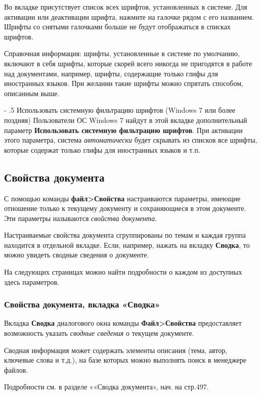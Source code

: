 ﻿\documentclass[a4paper,10pt]{article}
\makeatletter
\renewcommand\paragraph{%
   \@startsection{paragraph}{4}{0mm}%
      {-\baselineskip}%
      {.5\baselineskip}%
      {\normalfont\normalsize\bfseries}}
\makeatother
\begin{document}
 Во вкладке присутствует список всех шрифтов, установленных в системе. Для активации или деактивации шрифта, нажмите на галочке рядом с его названием. Шрифты со снятыми галочками больше не будут отображаться в списках шрифтов.
 
 Справочная информация: шрифты, установленные в системе по умолчанию, включают в себя шрифты, которые скорей всего никогда не пригодятся в работе над документами, например, шрифты, содержащие только глифы для иностранных языков. При желании такие шрифты можно спрятать способом, описанным выше.
 
 \paragraph{Использовать системную фильтрацию шрифтов (Windows 7 или более поздняя)}
 Пользователи ОС Windows 7 найдут в этой вкладке дополнительный параметр \textbf{Использовать системную фильтрацию шрифтов}. При активации этого параметра, система \textit{автоматически} будет скрывать из списков все шрифты, которые содержат только глифы для иностранных языков и т.п.
 
 \subsection{Свойства документа}
 С помощью команды \textbf{файл>Свойства} настраиваются параметры, имеющие отношение только к текущему документу и сохраняющиеся в этом документе. Эти параметры называются \textit{свойства документа}.
 
 Настраиваемые свойства документа сгруппированы по темам и каждая группа находится в отдельной вкладке. Если, например, нажать на вкладку \textbf{Сводка}, то можно увидеть сводные сведения о документе.
 
 На следующих страницах можно найти подробности о каждом из доступных здесь параметров.
 
 \subsubsection{Свойства документа, вкладка «Сводка»}
Вкладка \textbf{Сводка} диалогового окна команды \textbf{Файл>Свойства} предоставляет возможность указать \textit{сводные сведения} о текущем документе.

Сводная информация может содержать элементы описания (тема, автор, ключевые слова и т.д.), на базе которых можно выполнять поиск в менеджере файлов.

Подробности см. в разделе ««Сводка документа», нач. на стр.497.
 
\end{document}
